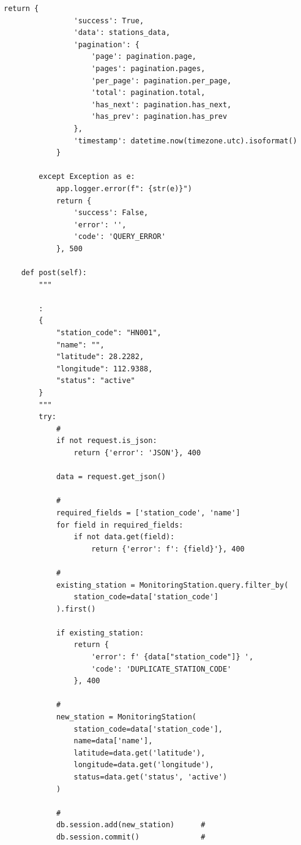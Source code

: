 \begin{lstlisting}[style=python]
            return {
                'success': True,
                'data': stations_data,
                'pagination': {
                    'page': pagination.page,
                    'pages': pagination.pages,
                    'per_page': pagination.per_page,
                    'total': pagination.total,
                    'has_next': pagination.has_next,
                    'has_prev': pagination.has_prev
                },
                'timestamp': datetime.now(timezone.utc).isoformat()
            }
            
        except Exception as e:
            app.logger.error(f": {str(e)}")
            return {
                'success': False,
                'error': '',
                'code': 'QUERY_ERROR'
            }, 500
    
    def post(self):
        """

        :
        {
            "station_code": "HN001",
            "name": "",
            "latitude": 28.2282,
            "longitude": 112.9388,
            "status": "active"
        }
        """
        try:
            # 
            if not request.is_json:
                return {'error': 'JSON'}, 400
            
            data = request.get_json()
            
            # 
            required_fields = ['station_code', 'name']
            for field in required_fields:
                if not data.get(field):
                    return {'error': f': {field}'}, 400
            
            # 
            existing_station = MonitoringStation.query.filter_by(
                station_code=data['station_code']
            ).first()
            
            if existing_station:
                return {
                    'error': f' {data["station_code"]} ',
                    'code': 'DUPLICATE_STATION_CODE'
                }, 400
            
            # 
            new_station = MonitoringStation(
                station_code=data['station_code'],
                name=data['name'],
                latitude=data.get('latitude'),
                longitude=data.get('longitude'),
                status=data.get('status', 'active')
            )
            
            # 
            db.session.add(new_station)      # 
            db.session.commit()              # 
            

\end{lstlisting}
